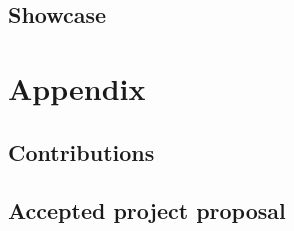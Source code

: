 \documentclass[ twoside,openright,titlepage,numbers=noenddot,headinclude,%
                footinclude=true,cleardoublepage=empty,abstractoff, %
                BCOR=5mm,paper=a4,fontsize=11pt,%
                ngerman,american,%
                ]{scrreprt}
\begin{document}
\chapter{Showcase}



\appendix
\cleardoublepage
\part{Appendix}
\chapter{Contributions}


\chapter{Accepted project proposal}


\cleardoublepage
\cleardoublepage
\end{document}
